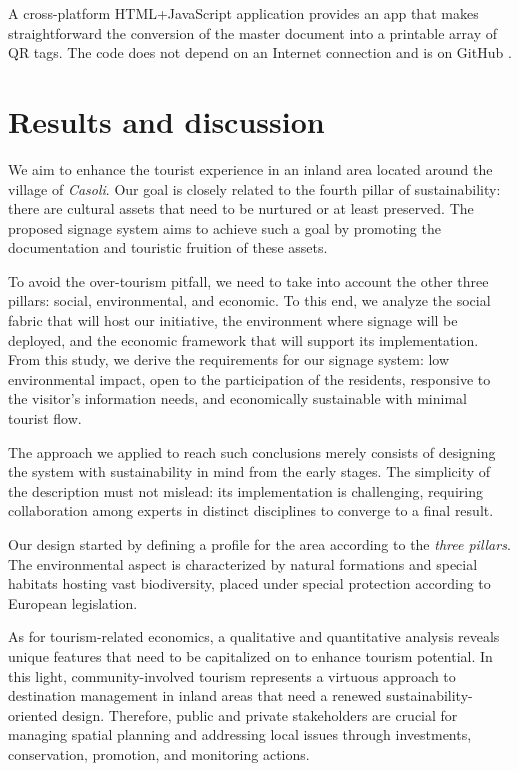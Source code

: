 \documentclass[sustainability,article,submit,pdftex,moreauthors]{Definitions/mdpi}
\begin{document}
A cross-platform HTML+JavaScript application provides an app that makes straightforward the conversion of the master document into a printable array of QR tags. The code does not depend on an Internet connection and is on GitHub .


\section{Results and discussion \label{sec:results}}

We aim to enhance the tourist experience in an inland area located around the village of \emph{Casoli}. Our goal is closely related to the fourth pillar of sustainability: there are cultural assets that need to be nurtured or at least preserved. The proposed signage system aims to achieve such a goal by promoting the documentation and touristic fruition of these assets.

To avoid the over-tourism pitfall, we need to take into account the other three pillars: social, environmental, and economic. To this end, we analyze the social fabric that will host our initiative, the environment where signage will be deployed, and the economic framework that will support its implementation. From this study, we derive the requirements for our signage system: low environmental impact, open to the participation of the residents, responsive to the visitor's information needs, and economically sustainable with minimal tourist flow. 

The approach we applied to reach such conclusions merely consists of designing the system with sustainability in mind from the early stages. The simplicity of the description must not mislead: its implementation is challenging, requiring collaboration among experts in distinct disciplines to converge to a final result. 

Our design started by defining a profile for the area according to the \emph{three pillars}. The environmental aspect is characterized by natural formations and special habitats hosting vast biodiversity, placed under special protection according to European legislation.

As for tourism-related economics, a qualitative and quantitative analysis \cite{loz09} reveals unique features that need to be capitalized on to enhance tourism potential. In this light, community-involved tourism represents a virtuous approach to destination management in inland areas that need a renewed sustainability-oriented design. Therefore, public and private stakeholders are crucial for managing spatial planning and addressing local issues through investments, conservation, promotion, and monitoring actions.
\end{document}
